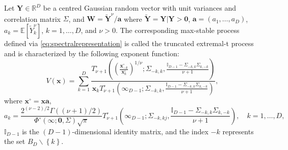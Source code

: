 \documentclass[12pt]{article}
\begin{document}

\begin{theorem}
\label{thm:truncated_extremal_t}    
Let $\bm Y \in \mathbb{R}^D$ be a centred Gaussian random vector with unit variances and correlation matrix $\Sigma$, and $\bm W= 
\tilde{\bm Y}^{\nu} / \bm a$
where $\tilde {\bm Y} = \bm Y | \bm Y > \bm 0$, $\bm a = (a_1, \ldots, a_D)$, $a_k=\mathbb E[\tilde Y_k^\nu]$, $k=1, \ldots, D$, and $\nu>0$. The corresponding max-stable process defined via \eqref{eq:spectralrepresentation} is called the truncated extremal-t process and is characterized by the following exponent function:
%
\begin{equation}
\label{eq:V_tet}
V(\bm x) = \sum_{k=1}^D \frac{T_{\nu+1}^\circ\left( \left(\frac{\bm x_{-k}^\circ}{\bm x_{k}^\circ}\right)^{1/\nu} ;\Sigma_{-k,k},\frac{\mathbb{I}_{D-1}-\Sigma_{-k,k}\Sigma_{k,-k} }{\nu+1}\right)}{\bm x_k T_{\nu+1}^\circ\left(\bm \infty_{D-1};\Sigma_{-k,k}, \frac{\mathbb{I}_{D-1}-\Sigma_{-k,k} \Sigma_{k,-k}}{\nu+1}\right)},
\end{equation}
%
where $\bm x^\circ = \bm x \bm a$,
%
\begin{equation*}
a_k =\frac{2^{(\nu-2)/2}\Gamma((\nu+1)/2)}{\Phi^\circ(\bm \infty;\bm 0, \Sigma) \sqrt{\pi}} T_{\nu+1}^\circ\left(
\bm \infty_{D-1};
\Sigma_{-k,kj}, \frac{\mathbb{I}_{D-1} -\Sigma_{-k,k} \Sigma_{k,-k}}{\nu+1} \right), \quad k=1,\dots,D,	    
\end{equation*}
%
$\mathbb{I}_{D-1}$ is the $(D-1)$-dimensional identity matrix, and the index $-k$ represents the set $B_D \backslash \left\{ k\right\}$.
\end{theorem}
\end{document}
